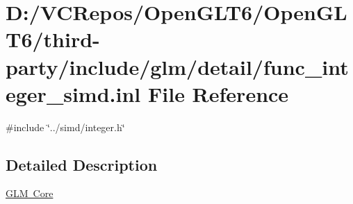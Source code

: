 \hypertarget{func__integer__simd_8inl}{}\section{D\+:/\+V\+C\+Repos/\+Open\+G\+L\+T6/\+Open\+G\+L\+T6/third-\/party/include/glm/detail/func\+\_\+integer\+\_\+simd.inl File Reference}
\label{func__integer__simd_8inl}
{\ttfamily \#include \char`\"{}../simd/integer.\+h\char`\"{}}\newline


\subsection{Detailed Description}
\mbox{\hyperlink{group__core}{G\+LM Core}} 